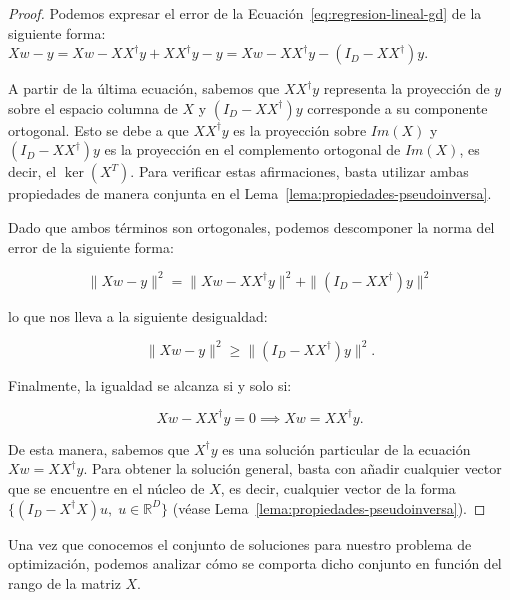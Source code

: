 \begin{proof}
    Podemos expresar el error de la Ecuación~\eqref{eq:regresion-lineal-gd} de la siguiente forma: $Xw - y = Xw - XX^{\dagger}y +XX^{\dagger}y - y = Xw - XX^{\dagger}y - (I_D - XX^{\dagger})y$.\newline

    A partir de la última ecuación, sabemos que $XX^{\dagger}y$ representa la proyección de $y$ sobre el espacio columna de $X$ y $(I_D - XX^{\dagger})y$ corresponde a su componente ortogonal. Esto se debe a que $XX^{\dagger}y$ es la proyección sobre $Im(X)$ y $(I_D - XX^{\dagger})y$ es la proyección en el complemento ortogonal de $Im(X)$, es decir, el $\ker(X^{T})$. Para verificar estas afirmaciones, basta utilizar ambas propiedades de manera conjunta en el Lema~\ref{lema:propiedades-pseudoinversa}.\newline

    Dado que ambos términos son ortogonales, podemos descomponer la norma del error de la siguiente forma:

    \[
        \| Xw - y \|^{2} = \| Xw - XX^{\dagger}y \|^{2} + \| (I_D - XX^{\dagger})y \|^{2}
    \]

    lo que nos lleva a la siguiente desigualdad:

    \[
        \| Xw - y \|^{2} \geq \| (I_D - XX^{\dagger})y \|^{2}.
    \]

    Finalmente, la igualdad se alcanza si y solo si:

    \[
        Xw - XX^{\dagger}y = 0 \implies  Xw = XX^{\dagger}y.
    \]

    De esta manera, sabemos que $X^{\dagger}y$ es una solución particular de la ecuación $Xw = XX^{\dagger}y$. Para obtener la solución general, basta con añadir cualquier vector que se encuentre en el núcleo de $X$, es decir, cualquier vector de la forma $\{ (I_D-X^{\dagger}X)u, \; u \in \mathbb{R}^{D} \}$ (véase Lema~\ref{lema:propiedades-pseudoinversa}).\newline
\end{proof}

Una vez que conocemos el conjunto de soluciones para nuestro problema de optimización, podemos analizar cómo se comporta dicho conjunto en función del rango de la matriz $X$.

